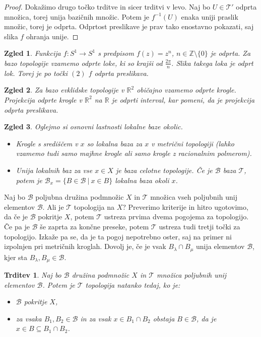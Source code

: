 \documentclass[10pt, a4paper]{article}
\newtheorem{trditev}[izr]{Trditev}
\newtheorem{zgled}{Zgled}[section]
\newenvironment{noticeC}{%
  \tcolorbox[%
  notitle,
  empty,
  enhanced,  %
  breakable,
  coltext=black, 
  fontupper=\rmfamily,
  parbox=false,
  noparskip,
  sharp corners,
  boxrule=-1pt,  %
  frame hidden,
  left=7pt,  %
  right=7pt,
  top=5pt,
  bottom=5pt,
  before skip=2.5ex plus 2pt,
  after skip=2.5ex plus 2pt,
  overlay unbroken and last={%
  },
  ]}
{\endtcolorbox}
\newenvironment{dokaz}%
  {\begin{noticeC}\begin{proof}}%
  {\end{proof}\end{noticeC}}
\newcommand{\Z}{\mathbb {Z}}
\newcommand{\R}{\mathbb {R}}
\newcommand{\topo}[1]{\mathcal{#1}}
\begin{document}
\begin{dokaz}
  Dokažimo drugo točko trditve in sicer trditvi v levo.
  Naj bo $U \in \mathcal{T'}$ odprta množica, torej unija bazičnih množic.
  Potem je $f^{-1} (U)$ enaka uniji praslik množic, torej je odprta.
  Odprtost preslikave je prav tako enostavno pokazati, saj slika $f$ ohranja unije.
\end{dokaz}

\begin{zgled}
  Funkcija $f: S^1 \to S^1$ s predpisom $f(z) = z^n$, $n \in \Z \setminus \{0\}$ je odprta.
  Za bazo topologije vzamemo odprte loke, ki so krajši od $\frac{2 \pi}{n}$.
  Slika takega loka je odprt lok. Torej je po točki $(2)$ $f$ odprta preslikava.
\end{zgled}

\begin{zgled}
  Za bazo evklidske topologije v $\R^2$ običajno vzamemo odprte krogle.
  Projekcija odprte krogle v $\R^2$ na $\R$ je odprti interval, kar pomeni, da je projekcija odprta preslikava.
\end{zgled}

\begin{zgled}
  Oglejmo si osnovni lastnosti lokalne baze okolic.
  \begin{itemize}
    \item Krogle s središčem v $x$ so lokalna baza za $x$ v metrični topologiji 
    (lahko vzamemo tudi samo majhne krogle ali samo krogle z racionalnim polmerom).
    \item Unija lokalnih baz za vse $x \in X$ je baza celotne topologije.
    Če je $\mathcal{B}$ baza $\mathcal{T}$, potem je $\mathcal{B}_x = \{B \in \mathcal{B}\ |\ x \in B\}$
    lokalna baza okoli $x$.
  \end{itemize}
\end{zgled}

Naj bo $\mathcal{B}$ poljubna družina podmnožic $X$ in $\mathcal{T}$ množica vseh poljubnih unij elementov $\mathcal{B}$.
Ali je $\mathcal{T}$ topologija na $X$? Preverimo kriterije in hitro ugotovimo, da če je $\mathcal{B}$ pokritje $X$,
potem $\topo{T}$ ustreza prvima dvema pogojema za topologijo.
Če pa je $\mathcal{B}$ še zaprta za končne preseke, potem $\mathcal{T}$ ustreza tudi tretji točki za topologijo.
Izkaže pa se, da je ta pogoj nepotrebno oster, saj na primer ni izpolnjen pri metričnih kroglah.
Dovolj je, če je vsak $B_\lambda \cap B_\mu$
unija elementov $\mathcal{B}$, kjer sta $B_\lambda, B_\mu \in \topo{B}$.

\begin{trditev}
  Naj bo $\mathcal{B}$ družina podmnožic $X$ in $\mathcal{T}$ množica poljubnih unij elementov $\mathcal{B}$.
  Potem je $\mathcal{T}$ topologija natanko tedaj, ko je:
  \begin{itemize}
    \item $\mathcal{B}$ pokritje $X$,
    \item za vsaka $B_1, B_2 \in \mathcal{B}$ in za vsak $x \in B_1 \cap B_2$ obstaja $B \in \mathcal{B}$, da je $x \in B \subseteq B_1 \cap B_2$.
  \end{itemize}
\end{trditev}
\end{document}
